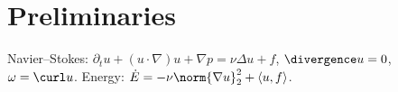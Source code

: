 \section{Preliminaries}
Navier--Stokes: $\partial_t u+(u\cdot\nabla)u+\nabla p=\nu\Delta u + f$, $\divergence u=0$, $\omega=\curl u$.
Energy: $\dot E=-\nu\norm{\nabla u}_2^2+\langle u,f\rangle$.
